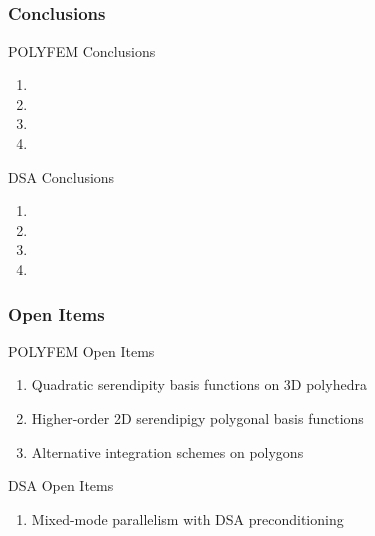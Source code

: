 \documentclass[compress,10pt]{beamer}
\begin{document}
\subsection{}
\begin{frame}[t]\frametitle{Conclusions}
\begin{block}{POLYFEM Conclusions}
\begin{enumerate}
\item
\item
\item
\item
\end{enumerate}
\end{block}
\begin{block}{DSA Conclusions}
\begin{enumerate}
\item
\item
\item
\item
\end{enumerate}
\end{block}
\end{frame}
\begin{frame}[t]\frametitle{Open Items}
\begin{block}{POLYFEM Open Items}
\begin{enumerate}
\item Quadratic serendipity basis functions on 3D polyhedra
\item Higher-order 2D serendipigy polygonal basis functions
\item Alternative integration schemes on polygons
\end{enumerate}
\end{block}
\begin{block}{DSA Open Items}
\begin{enumerate}
\item Mixed-mode parallelism with DSA preconditioning
\end{enumerate}
\end{block}
\end{frame}

\typeout{***********************************************************************************}
\end{document}
